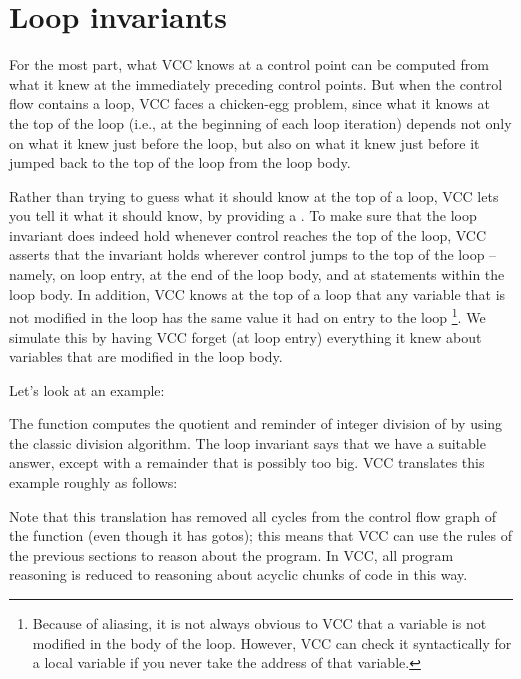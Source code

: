 \section{Loop invariants}

For the most part, what VCC knows at a control point can be
computed from what it knew at the immediately preceding control
points. But when the control flow contains a loop, VCC faces a
chicken-egg problem, since what it knows at the top of the loop (i.e.,
at the beginning of each loop iteration) depends not only on what it
knew just before the loop, but also on what it knew just before it
jumped back to the top of the loop from the loop body.

Rather than trying to guess what it should know at the top of a loop,
VCC lets you tell it what it should know, by providing a . To make sure that the loop invariant does indeed hold 
whenever control reaches the top
of the loop, VCC asserts that the invariant holds wherever control
jumps to the top of the loop -- namely, on loop entry, at the end of
the loop body, and at  statements within the loop body.
In addition, VCC knows at the top of a loop
that any variable that is not modified in the loop has 
the same value it had on entry to the loop%
\footnote{ Because of aliasing, it is not always obvious to VCC that a
  variable is not modified in the body of the loop. However, VCC can
  check it syntactically for a local variable if you never take the
  address of that variable.}. We simulate this by having VCC forget
(at loop entry) everything it knew about variables that are modified
in the loop body.

Let's look at an example:
\noindent

The  function computes the quotient and reminder of integer division
of  by  using the classic division algorithm.
The loop invariant says that we have a suitable answer, except with a
remainder that is possibly too big. VCC translates this example roughly as follows:

\noindent
Note that this translation has removed all cycles from the control
flow graph of the function (even though it has gotos); this means that
VCC can use the rules of the previous sections to reason about the
program. In VCC, all program reasoning is reduced to reasoning about
acyclic chunks of code in this way.


